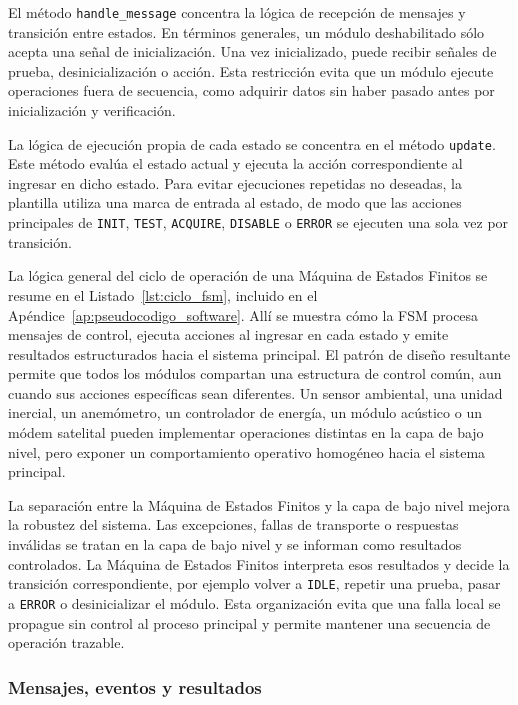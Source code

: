 El método \texttt{handle\_message} concentra la lógica de recepción de mensajes y transición entre estados. En términos generales, un módulo deshabilitado sólo acepta una señal de inicialización. Una vez inicializado, puede recibir señales de prueba, desinicialización o acción. Esta restricción evita que un módulo ejecute operaciones fuera de secuencia, como adquirir datos sin haber pasado antes por inicialización y verificación.

La lógica de ejecución propia de cada estado se concentra en el método \texttt{update}. Este método evalúa el estado actual y ejecuta la acción correspondiente al ingresar en dicho estado. Para evitar ejecuciones repetidas no deseadas, la plantilla utiliza una marca de entrada al estado, de modo que las acciones principales de \texttt{INIT}, \texttt{TEST}, \texttt{ACQUIRE}, \texttt{DISABLE} o \texttt{ERROR} se ejecuten una sola vez por transición.

La lógica general del ciclo de operación de una Máquina de Estados Finitos se resume en el Listado~\ref{lst:ciclo_fsm}, incluido en el Apéndice~\ref{ap:pseudocodigo_software}. Allí se muestra cómo la FSM procesa mensajes de control, ejecuta acciones al ingresar en cada estado y emite resultados estructurados hacia el sistema principal.
El patrón de diseño resultante permite que todos los módulos compartan una estructura de control común, aun cuando sus acciones específicas sean diferentes. Un sensor ambiental, una unidad inercial, un anemómetro, un controlador de energía, un módulo acústico o un módem satelital pueden implementar operaciones distintas en la capa de bajo nivel, pero exponer un comportamiento operativo homogéneo hacia el sistema principal.

La separación entre la Máquina de Estados Finitos y la capa de bajo nivel mejora la robustez del sistema. Las excepciones, fallas de transporte o respuestas inválidas se tratan en la capa de bajo nivel y se informan como resultados controlados. La Máquina de Estados Finitos interpreta esos resultados y decide la transición correspondiente, por ejemplo volver a \texttt{IDLE}, repetir una prueba, pasar a \texttt{ERROR} o desinicializar el módulo. Esta organización evita que una falla local se propague sin control al proceso principal y permite mantener una secuencia de operación trazable.

\subsubsection{Mensajes, eventos y resultados}
\label{subsubsec:mensajes_eventos_resultados}

